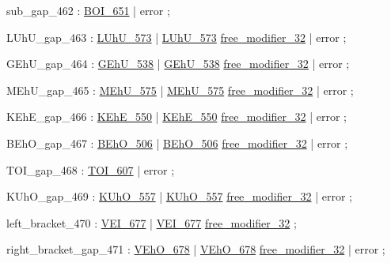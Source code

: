 \label{html:y462}
sub_gap_462             :  \hyperref[html:y651]{BOI_651}
                        |  error
                        ;

\label{html:y463}
LUhU_gap_463            :  \hyperref[html:y573]{LUhU_573}
                        |  \hyperref[html:y573]{LUhU_573}  \hyperref[html:y32]{free_modifier_32}
                        |  error
                        ;

\label{html:y464}
GEhU_gap_464            :  \hyperref[html:y538]{GEhU_538}
                        |  \hyperref[html:y538]{GEhU_538}  \hyperref[html:y32]{free_modifier_32}
                        |  error
                        ;

\label{html:y465}
MEhU_gap_465            :  \hyperref[html:y575]{MEhU_575}
                        |  \hyperref[html:y575]{MEhU_575}   \hyperref[html:y32]{free_modifier_32}
                        |  error
                        ;

\label{html:y466}
KEhE_gap_466            :  \hyperref[html:y550]{KEhE_550}
                        |  \hyperref[html:y550]{KEhE_550}  \hyperref[html:y32]{free_modifier_32}
                        |  error
                        ;

\label{html:y467}
BEhO_gap_467            :  \hyperref[html:y506]{BEhO_506}
                        |  \hyperref[html:y506]{BEhO_506}  \hyperref[html:y32]{free_modifier_32}
                        |  error
                        ;

\label{html:y468}
TOI_gap_468             :  \hyperref[html:y607]{TOI_607}
                        |  error
                        ;

\label{html:y469}
KUhO_gap_469            :  \hyperref[html:y557]{KUhO_557}
                        |  \hyperref[html:y557]{KUhO_557}  \hyperref[html:y32]{free_modifier_32}
                        |  error
                        ;

\label{html:y470}
left_bracket_470        :  \hyperref[html:y677]{VEI_677}
                        |  \hyperref[html:y677]{VEI_677}  \hyperref[html:y32]{free_modifier_32}
                        ;

\label{html:y471}
right_bracket_gap_471   :  \hyperref[html:y678]{VEhO_678}
                        |  \hyperref[html:y678]{VEhO_678}  \hyperref[html:y32]{free_modifier_32}
                        |  error
                        ;

